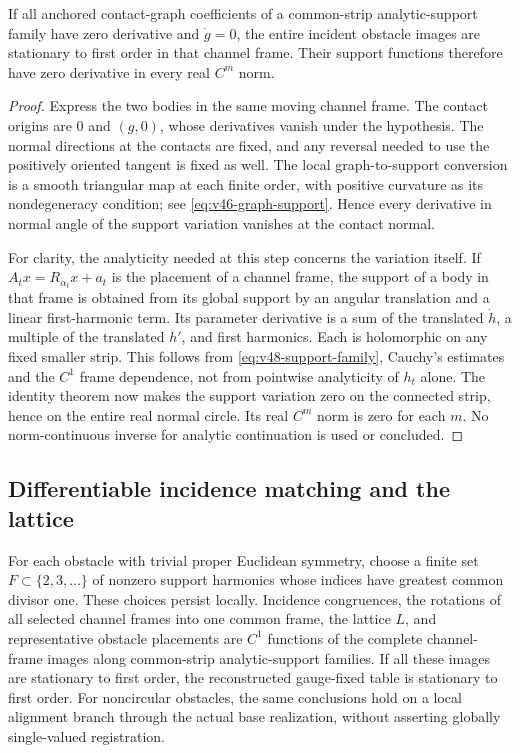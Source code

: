 \begin{lemma}
\label{lem:v48-analytic-variation}
If all anchored contact-graph coefficients of a common-strip
analytic-support family have zero derivative and $\dot g=0$, the entire
incident obstacle images are stationary to first order in that channel
frame.  Their support functions therefore have zero derivative in every
real $C^m$ norm.
\end{lemma}

\begin{proof}
Express the two bodies in the same moving channel frame.  The contact
origins are $0$ and $(g,0)$, whose derivatives vanish under the hypothesis.
The normal directions at the contacts are fixed, and any reversal
needed to use the positively oriented tangent is fixed as well.
The local graph-to-support conversion is a smooth triangular map at
each finite order, with positive curvature as its nondegeneracy
condition; see \eqref{eq:v46-graph-support}.  Hence every derivative in
normal angle of the support variation vanishes at the contact normal.

For clarity, the analyticity needed at this step concerns the variation
itself.  If $A_t x=R_{\alpha_t}x+a_t$ is the placement of a channel frame,
the support of a body in that frame is obtained from its global support
by an angular translation and a linear first-harmonic term.  Its
parameter derivative is a sum of the translated $\dot h$, a multiple
of the translated $h'$, and first harmonics.  Each is holomorphic on
any fixed smaller strip.  This follows from
\eqref{eq:v48-support-family}, Cauchy's estimates and the $C^1$
frame dependence, not from pointwise analyticity of $h_t$ alone.
The identity theorem now makes the support variation zero on the
connected strip, hence on the entire real normal circle.  Its real
$C^m$ norm is zero for each $m$.  No norm-continuous inverse for
analytic continuation is used or concluded.
\end{proof}

\subsection{Differentiable incidence matching and the lattice}

\begin{lemma}
\label{lem:v48-registration}
For each obstacle with trivial proper Euclidean symmetry, choose a
finite set $F\subset\{2,3,\ldots\}$ of nonzero support harmonics whose
indices have greatest common divisor one.  These choices persist
locally.  Incidence congruences, the rotations of all selected channel
frames into one common frame, the lattice $L$, and representative obstacle
placements are $C^1$ functions of the complete channel-frame images
along common-strip analytic-support families.  If all these images are
stationary to first order, the reconstructed gauge-fixed table is
stationary to first order.
For noncircular obstacles, the same conclusions hold on a local alignment
branch through the actual base realization, without asserting globally
single-valued registration.
\end{lemma}

